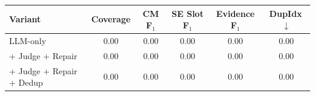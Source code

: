 \begin{tabularx}{\textwidth}{@{}l c c c c c@{}}
\toprule
\textbf{Variant} & \textbf{Coverage} & \textbf{CM F$_1$} & \textbf{SE Slot F$_1$} & \textbf{Evidence F$_1$} & \textbf{DupIdx}\,$\downarrow$ \\
\midrule
LLM-only & 0.00 & 0.00 & 0.00 & 0.00 & 0.00 \\
+ Judge + Repair & 0.00 & 0.00 & 0.00 & 0.00 & 0.00 \\
+ Judge + Repair + Dedup & 0.00 & 0.00 & 0.00 & 0.00 & 0.00 \\
\bottomrule
\end{tabularx}